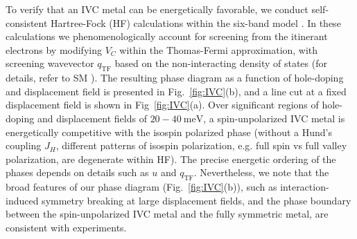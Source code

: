 \documentclass[aps,pra,twocolumn,superscriptaddress,10pt,article,nofootinbib,showpacs,longbibliography]{revtex4-1}
\begin{document}
To verify that an IVC metal can be energetically favorable, we conduct self-consistent Hartree-Fock (HF) calculations within the  six-band model \cite{Jung2013}.
In these calculations we phenomenologically account for screening from the itinerant electrons by modifying $V_C$ within the Thomas-Fermi approximation, with screening wavevector $q_{\mathrm{TF}}$ based on the non-interacting density of states (for details, refer to SM \cite{SM}).
The resulting phase diagram as a function of hole-doping and displacement field is presented in Fig.~\ref{fig:IVC}(b), and a line cut at a fixed displacement field is shown in Fig~\ref{fig:IVC}(a).
Over significant regions of hole-doping and displacement fields of $20 - \SI{40}{\meV}$, a spin-unpolarized IVC metal is energetically competitive with the isospin polarized phase (without a Hund's coupling $J_H$, different patterns of isospin polarization, e.g. full spin vs full valley polarization, are degenerate within HF). 
The precise energetic ordering of the phases depends on details such as $u$ and $q_{\textrm{TF}}$.
Nevertheless, we note that the broad features of our phase diagram (Fig.~\ref{fig:IVC}(b)), such as interaction-induced symmetry breaking at large displacement fields, and the phase boundary between the spin-unpolarized IVC metal and the fully symmetric metal, are consistent with experiments.
\end{document}
